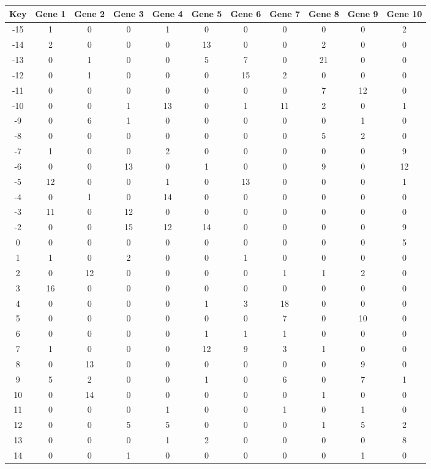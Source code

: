 \begin{tabular}{|c|c|c|c|c|c|c|c|c|c|c|}
\hline
Key & Gene 1 & Gene 2 & Gene 3 & Gene 4 & Gene 5 & Gene 6 & Gene 7 & Gene 8 & Gene 9 & Gene 10 \\
\hline
-15 & 1 & 0 & 0 & 1 & 0 & 0 & 0 & 0 & 0 & 2 \\
-14 & 2 & 0 & 0 & 0 & 13 & 0 & 0 & 2 & 0 & 0 \\
-13 & 0 & 1 & 0 & 0 & 5 & 7 & 0 & 21 & 0 & 0 \\
-12 & 0 & 1 & 0 & 0 & 0 & 15 & 2 & 0 & 0 & 0 \\
-11 & 0 & 0 & 0 & 0 & 0 & 0 & 0 & 7 & 12 & 0 \\
-10 & 0 & 0 & 1 & 13 & 0 & 1 & 11 & 2 & 0 & 1 \\
-9 & 0 & 6 & 1 & 0 & 0 & 0 & 0 & 0 & 1 & 0 \\
-8 & 0 & 0 & 0 & 0 & 0 & 0 & 0 & 5 & 2 & 0 \\
-7 & 1 & 0 & 0 & 2 & 0 & 0 & 0 & 0 & 0 & 9 \\
-6 & 0 & 0 & 13 & 0 & 1 & 0 & 0 & 9 & 0 & 12 \\
-5 & 12 & 0 & 0 & 1 & 0 & 13 & 0 & 0 & 0 & 1 \\
-4 & 0 & 1 & 0 & 14 & 0 & 0 & 0 & 0 & 0 & 0 \\
-3 & 11 & 0 & 12 & 0 & 0 & 0 & 0 & 0 & 0 & 0 \\
-2 & 0 & 0 & 15 & 12 & 14 & 0 & 0 & 0 & 0 & 9 \\
0 & 0 & 0 & 0 & 0 & 0 & 0 & 0 & 0 & 0 & 5 \\
1 & 1 & 0 & 2 & 0 & 0 & 1 & 0 & 0 & 0 & 0 \\
2 & 0 & 12 & 0 & 0 & 0 & 0 & 1 & 1 & 2 & 0 \\
3 & 16 & 0 & 0 & 0 & 0 & 0 & 0 & 0 & 0 & 0 \\
4 & 0 & 0 & 0 & 0 & 1 & 3 & 18 & 0 & 0 & 0 \\
5 & 0 & 0 & 0 & 0 & 0 & 0 & 7 & 0 & 10 & 0 \\
6 & 0 & 0 & 0 & 0 & 1 & 1 & 1 & 0 & 0 & 0 \\
7 & 1 & 0 & 0 & 0 & 12 & 9 & 3 & 1 & 0 & 0 \\
8 & 0 & 13 & 0 & 0 & 0 & 0 & 0 & 0 & 9 & 0 \\
9 & 5 & 2 & 0 & 0 & 1 & 0 & 6 & 0 & 7 & 1 \\
10 & 0 & 14 & 0 & 0 & 0 & 0 & 0 & 1 & 0 & 0 \\
11 & 0 & 0 & 0 & 1 & 0 & 0 & 1 & 0 & 1 & 0 \\
12 & 0 & 0 & 5 & 5 & 0 & 0 & 0 & 1 & 5 & 2 \\
13 & 0 & 0 & 0 & 1 & 2 & 0 & 0 & 0 & 0 & 8 \\
14 & 0 & 0 & 1 & 0 & 0 & 0 & 0 & 0 & 1 & 0 \\
\hline
\end{tabular}